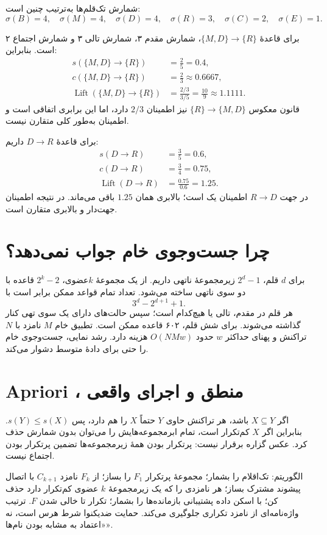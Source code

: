 \documentclass[12pt,a4paper,oneside]{report}
\begin{document}
شمارش تک‌قلم‌ها به‌ترتیب چنین است:
\[\sigma(B)=4,\quad\sigma(M)=4,\quad\sigma(D)=4,\quad\sigma(R)=3,\quad\sigma(C)=2,\quad\sigma(E)=1.\]

برای قاعدهٔ $\{M,D\}\to\{R\}$، شمارش مقدم ۳، شمارش تالی ۳ و شمارش اجتماع ۲ است. بنابراین:
\begin{align*}
s(\{M,D\}\to\{R\})&=\frac25=0.4,\\
c(\{M,D\}\to\{R\})&=\frac23\approx0.6667,\\
\operatorname{Lift}(\{M,D\}\to\{R\})&=\frac{2/3}{3/5}=\frac{10}{9}\approx1.1111.
\end{align*}
قانون معکوس $\{R\}\to\{M,D\}$ نیز اطمینان $2/3$ دارد، اما این برابری اتفاقی است و اطمینان به‌طور کلی متقارن نیست.

برای قاعدهٔ $D\to R$ داریم:
\begin{align*}
s(D\to R)&=\frac35=0.6,\\
c(D\to R)&=\frac34=0.75,\\
\operatorname{Lift}(D\to R)&=\frac{0.75}{0.6}=1.25.
\end{align*}
در جهت $R\to D$ اطمینان یک است؛ بالابری همان $1.25$ باقی می‌ماند. در نتیجه اطمینان جهت‌دار و بالابری متقارن است.

\section{چرا جست‌وجوی خام جواب نمی‌دهد؟}

برای $d$ قلم، $2^d-1$ زیرمجموعهٔ ناتهی داریم. از یک مجموعهٔ $k$عضوی، $2^k-2$ قاعده با دو سوی ناتهی ساخته می‌شود. تعداد تمام قواعد ممکن برابر است با
\[3^d-2^{d+1}+1.\]
هر قلم در مقدم، تالی یا هیچ‌کدام است؛ سپس حالت‌های دارای یک سوی تهی کنار گذاشته می‌شوند. برای شش قلم، ۶۰۲ قاعده ممکن است. تطبیق خام $M$ نامزد با $N$ تراکنش و پهنای حداکثر $w$ حدود $O(NMw)$ هزینه دارد. رشد نمایی، جست‌وجوی خام را حتی برای دادهٔ متوسط دشوار می‌کند.

\section{Apriori ، منطق و اجرای واقعی}

اگر $X\subseteq Y$ باشد، هر تراکنش حاوی $Y$ حتماً $X$ را هم دارد، پس $s(Y)\le s(X)$. بنابراین اگر $X$ کم‌تکرار است، تمام ابرمجموعه‌هایش را می‌توان بدون شمارش حذف کرد. عکس گزاره برقرار نیست: پرتکرار بودن همهٔ زیرمجموعه‌ها تضمین پرتکرار بودن اجتماع نیست.

الگوریتم: تک‌اقلام را بشمار؛ مجموعهٔ پرتکرار $F_1$ را بساز؛ از $F_k$ نامزد $C_{k+1}$ با اتصال پیشوند مشترک بساز؛ هر نامزدی را که یک زیرمجموعهٔ $k$ عضوی کم‌تکرار دارد حذف کن؛ با اسکن داده پشتیبانی بازمانده‌ها را بشمار؛ تکرار تا خالی شدن $F$. ترتیب واژه‌نامه‌ای از نامزد تکراری جلوگیری می‌کند. حمایت ضدیکنوا شرط هرس است، نه «اعتماد به مشابه بودن نام‌ها».
\end{document}
